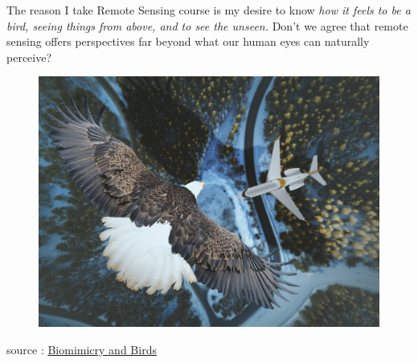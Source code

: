 \documentclass[
  letterpaper,
  DIV=11,
  numbers=noendperiod]{scrreprt}
\begin{document}
The reason I take Remote Sensing course is my desire to know \emph{how
it feels to be a bird, seeing things from above, and to see the unseen.}
Don't we agree that remote sensing offers perspectives far beyond what
our human eyes can naturally perceive?

\begin{figure}

\includegraphics[width=5.07292in,height=\textheight]{images/clipboard-2217286199.png} \hfill{}

\end{figure}

source :
\href{https://chirpforbirds.com/nature-advocacy/biomimicry-and-birds/}{Biomimicry
and Birds}
\end{document}
